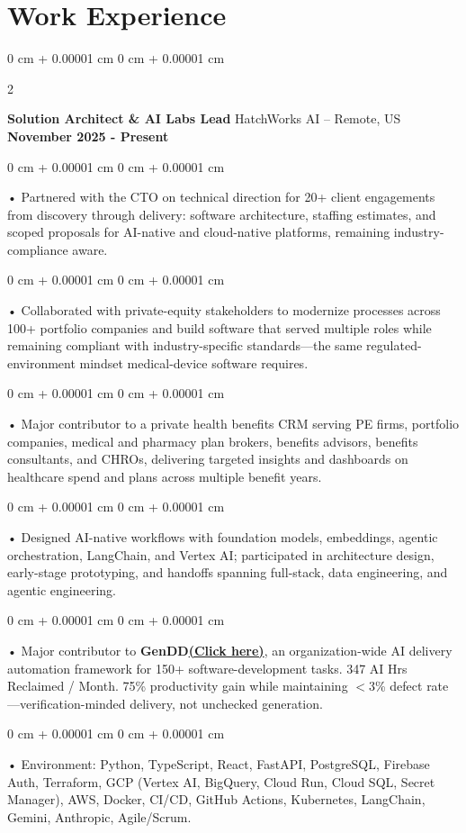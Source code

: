 \documentclass[10pt, letterpaper]{article}
\newenvironment{onecolentry}{
    \begin{adjustwidth}{
        0 cm + 0.00001 cm
    }{
        0 cm + 0.00001 cm
    }
}{
    \end{adjustwidth}
} %
\newenvironment{twocolentry}[2][]{
    \onecolentry
    \def\secondColumn{#2}
    \setcolumnwidth{\fill, 4.5 cm}
    \begin{paracol}{2}
}{
    \switchcolumn \raggedleft \secondColumn
    \end{paracol}
    \endonecolentry
} %
\begin{document}
    \vspace{0.5cm}
    \section{Work Experience}
        \vspace{0.1cm}

        \begin{twocolentry}{
            \textbf{November 2025 - Present}
        }
            \textbf{Solution Architect \& AI Labs Lead} HatchWorks AI -- Remote, US\end{twocolentry}

        \begin{onecolentry}
             • Partnered with the CTO on technical direction for 20+ client engagements from discovery through delivery: software architecture, staffing estimates, and scoped proposals for AI-native and cloud-native platforms, remaining industry-compliance aware.
        \end{onecolentry}
        \begin{onecolentry}
             • Collaborated with private-equity stakeholders to modernize processes across 100+ portfolio companies and build software that served multiple roles while remaining compliant with industry-specific standards---the same regulated-environment mindset medical-device software requires.
        \end{onecolentry}
        \begin{onecolentry}
             • Major contributor to a private health benefits CRM serving PE firms, portfolio companies, medical and pharmacy plan brokers, benefits advisors, benefits consultants, and CHROs, delivering targeted insights and dashboards on healthcare spend and plans across multiple benefit years.
        \end{onecolentry}
        \begin{onecolentry}
             • Designed AI-native workflows with foundation models, embeddings, agentic orchestration, LangChain, and Vertex AI; participated in architecture design, early-stage prototyping, and handoffs spanning full-stack, data engineering, and agentic engineering.
        \end{onecolentry}
        \begin{onecolentry}
             • Major contributor to \textbf{GenDD}\href{https://hatchworks.com/generative-driven-development/}{\textbf{(Click here)}}, an organization-wide AI delivery automation framework for 150+ software-development tasks. 347 AI Hrs Reclaimed / Month. 75\% productivity gain while maintaining $<$3\% defect rate---verification-minded delivery, not unchecked generation.
        \end{onecolentry}
        \begin{onecolentry}
             • Environment: Python, TypeScript, React, FastAPI, PostgreSQL, Firebase Auth, Terraform, GCP (Vertex AI, BigQuery, Cloud Run, Cloud SQL, Secret Manager), AWS, Docker, CI/CD, GitHub Actions, Kubernetes, LangChain, Gemini, Anthropic, Agile/Scrum.
        \end{onecolentry}
\end{document}
